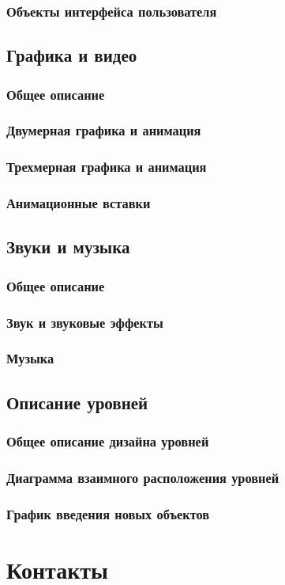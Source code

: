 \documentclass[12pt]{article}
\begin{document}
        \subsubsection{Объекты интерфейса пользователя}
    \subsection{Графика и видео}
        \subsubsection{Общее описание}
        \subsubsection{Двумерная графика и анимация}
        \subsubsection{Трехмерная графика и анимация}
        \subsubsection{Анимационные вставки}
    \subsection{Звуки и музыка}
        \subsubsection{Общее описание}
        \subsubsection{Звук и звуковые эффекты}
        \subsubsection{Музыка}
    \subsection{Описание уровней}
        \subsubsection{Общее описание дизайна уровней}
        \subsubsection{Диаграмма взаимного расположения уровней}
        \subsubsection{График введения новых объектов}

\section{Контакты}

\newpage
\end{document}
